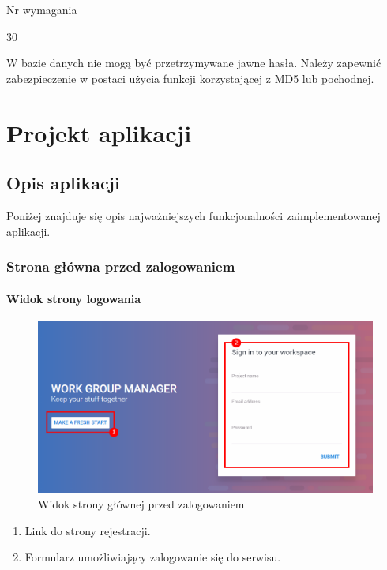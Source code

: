 \documentclass[eng,printmode]{mgr}
\begin{document}
\begin{labeling}{Nr wymagania}
 \item [\textbf{Nr wymagania}:] 30
 \item [\textbf{Treść}:] W bazie danych nie mogą być przetrzymywane jawne hasła. Należy zapewnić zabezpieczenie w postaci użycia funkcji korzystającej z MD5 \cite{MD5} lub pochodnej.
\end{labeling}

\chapter{Projekt aplikacji}
\section{Opis aplikacji}
Poniżej znajduje się opis najważniejszych funkcjonalności zaimplementowanej aplikacji.
\subsection{Strona główna przed zalogowaniem}

\subsubsection{Widok strony logowania}
\begin{figure}[H]
  \begin{center}
  \includegraphics[scale=0.62]{login}
  \end{center}
  \caption{Widok strony głównej przed zalogowaniem}
\end{figure}

\begin{enumerate}
  \item Link do strony rejestracji.
  \item Formularz umożliwiający zalogowanie się do serwisu.
\end{enumerate}
\newpage
\end{document}
